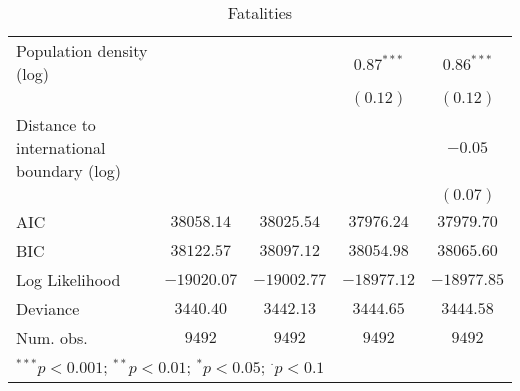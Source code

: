 \begin{sidewaystable}
\begin{center}
{\begin{tabular}{l c c c c}
Population density (log)                 &               &               & $0.87^{***}$   & $0.86^{***}$   \\
                                         &               &               & $(0.12)$       & $(0.12)$       \\
Distance to international boundary (log) &               &               &                & $-0.05$        \\
                                         &               &               &                & $(0.07)$       \\
\midrule
AIC                                      & $38058.14$    & $38025.54$    & $37976.24$     & $37979.70$     \\
BIC                                      & $38122.57$    & $38097.12$    & $38054.98$     & $38065.60$     \\
Log Likelihood                           & $-19020.07$   & $-19002.77$   & $-18977.12$    & $-18977.85$    \\
Deviance                                 & $3440.40$     & $3442.13$     & $3444.65$      & $3444.58$      \\
Num. obs.                                & $9492$        & $9492$        & $9492$         & $9492$         \\
\bottomrule
\multicolumn{5}{l}{\scriptsize{$^{***}p<0.001$; $^{**}p<0.01$; $^{*}p<0.05$; $^{\cdot}p<0.1$}}
\end{tabular}
}
\caption{Fatalities}
\label{interaction_interdeaths}
\end{center}
\end{sidewaystable}
